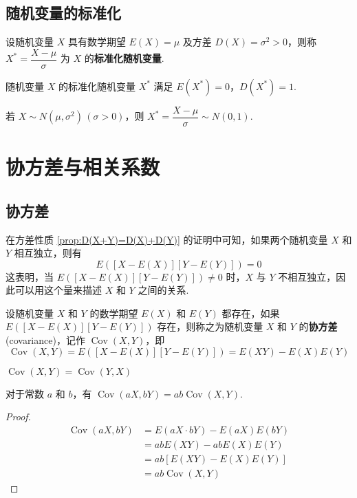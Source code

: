 \subsection{随机变量的标准化}

设随机变量 $X$ 具有数学期望 $E(X)=\mu$ 及方差 $D(X) = \sigma^2 > 0$，则称 $X^* = \dfrac{X-\mu}{\sigma}$ 为 $X$ 的\textbf{标准化随机变量}.

随机变量 $X$ 的标准化随机变量 $X^*$ 满足 $E(X^*)=0$，$D(X^*)=1$.

\vspace{0.5em}

若 $X \sim N(\mu,\sigma^2) \, (\sigma > 0)$，则 $X^* = \dfrac{X-\mu}{\sigma} \sim N(0,1)$.

\section{协方差与相关系数}

\subsection{协方差}

在方差性质 \ref*{prop:D(X+Y)=D(X)+D(Y)} 的证明中可知，如果两个随机变量 $X$ 和 $Y$ 相互独立，则有
$$
E([X-E(X)][Y-E(Y)]) = 0
$$
这表明，当 $E([X-E(X)][Y-E(Y)]) \not= 0$ 时，$X$ 与 $Y$ 不相互独立，因此可以用这个量来描述 $X$ 和 $Y$ 之间的关系.

\begin{definition}
    设随机变量 $X$ 和 $Y$ 的数学期望 $E(X)$ 和 $E(Y)$ 都存在，如果 $E([X-E(X)][Y-E(Y)])$ 存在，则称之为随机变量 $X$ 和 $Y$ 的\textbf{协方差}(covariance)，记作 $\operatorname{Cov}(X,Y)$，即
    $$
    \operatorname{Cov}(X,Y) = E([X-E(X)][Y-E(Y)]) = E(XY) - E(X) E(Y)
    $$
\end{definition}

\begin{property}
    $\operatorname{Cov}(X,Y) = \operatorname{Cov}(Y,X)$
\end{property}

\begin{property}
    对于常数 $a$ 和 $b$，有 $\operatorname{Cov}(aX,bY) = ab \operatorname{Cov}(X,Y)$.
\end{property}

\begin{proof}
    $$
    \begin{aligned}
        \operatorname{Cov}(aX,bY) &= E(aX \cdot bY) - E(aX) E(bY) \\
        &= ab E(XY) - ab E(X) E(Y) \\
        &= ab[E(XY) - E(X) E(Y)] \\
        &= ab \operatorname{Cov}(X,Y)
    \end{aligned}
    $$
\end{proof}

